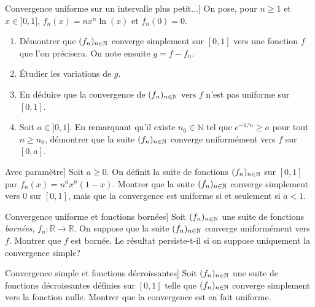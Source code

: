 \documentclass{book}
\begin{document}
%
\begin{Exercice}Convergence uniforme sur un intervalle plus petit...]
On pose, pour $n\geq 1$ et $x\in ]0,1]$, $f_n(x)=nx^n\ln(x)$ et $f_n(0)=0$.
\begin{enumerate}
\item Démontrer que $(f_n)_{n\in\mathbb{N}}$ converge simplement sur $[0,1]$ vers une fonction $f$ que l'on précisera. On note ensuite $g=f-f_n$.
\item \'Etudier les variations de $g$. 
\item En déduire que la convergence de $(f_n)_{n\in\mathbb{N}}$ vers $f$ n'est pas uniforme sur $[0,1]$.
\item Soit $a\in ]0,1]$. En remarquant qu'il existe $n_0\in\mathbb N$ tel que $e^{-1/n}\geq a$ pour tout $n\geq n_0$, démontrer que la suite $(f_n)_{n\in\mathbb{N}}$ converge uniformément vers $f$ sur $[0,a]$.
\end{enumerate}
\end{Exercice}




\begin{Exercice}Avec paramètre]
Soit $a\geq 0$. On définit la suite de fonctions $(f_n)_{n\in\mathbb{N}}$ sur $[0,1]$ par $f_n(x)=n^a x^n(1-x)$.
Montrer que la suite $(f_n)_{n\in\mathbb{N}}$ converge simplement vers 0 sur $[0,1]$, mais que la convergence est uniforme si et seulement si
$a<1.$
\end{Exercice}

\begin{Exercice}Convergence uniforme et fonctions bornées]
Soit $(f_n)_{n\in\mathbb{N}}$ une suite de fonctions \emph{bornées}, $f_n:\mathbb R\to\mathbb R$.
On suppose que la suite $(f_n)_{n\in\mathbb{N}}$ converge uniformément vers $f$. Montrer que $f$ est
bornée. Le résultat persiste-t-il si on suppose uniquement la convergence simple?
\end{Exercice}

\begin{Exercice}Convergence simple et fonctions décroissantes]
Soit $(f_n)_{n\in\mathbb{N}}$ une suite de fonctions décroissantes définies sur $[0,1]$ telle que $(f_n)_{n\in\mathbb{N}}$ converge simplement vers la fonction nulle. Montrer que la convergence est en fait uniforme.
\end{Exercice}
\end{document}
